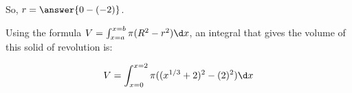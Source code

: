 \documentclass{ximera}
\begin{document}
\begin{exercise}
\begin{exercise}
\begin{exercise}
\begin{exercise}
\begin{multipleChoice}
\end{multipleChoice} 

So, $r= \answer{0-(-2)}$.


\begin{exercise}
Using the formula $V = \int_{x=a}^{x=b} \pi (R^2-r^2) \d x$, an integral that gives the volume of this solid of revolution is:

\[
V = \int_{x=0}^{x=2} \pi((x^{1/3}+2)^2-(2)^2) \d x %
\]

\end{exercise}
\end{exercise}    
\end{exercise}
\end{exercise}
\end{exercise}

\end{document}
